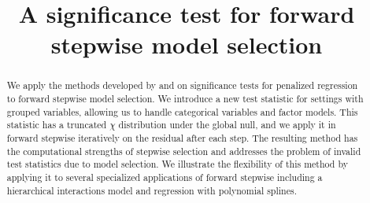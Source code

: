\documentclass{imsart}
\begin{document}
\begin{frontmatter}

\title{A significance test for forward stepwise model selection}




\address{Department of Statistics\\  Stanford University\\ Sequoia
Hall \\390 Serra Mall\\ Stanford, CA 94305, U.S.A.\\ }


\begin{abstract}
  We apply the methods developed by \cite{significance:lasso} and
  \cite{tests:adaptive} on significance tests for penalized
  regression to forward stepwise model selection. We introduce a new
  test statistic for settings with grouped variables, allowing us to
  handle categorical variables and factor models. This
  statistic has a truncated $\chi$ distribution under the global null,
  and we apply it in forward stepwise iteratively on the residual after
  each step. The resulting method
  has the computational strengths of stepwise selection and addresses
  the problem of invalid test statistics due to model selection.
  We illustrate the flexibility of this method by applying it to
  several specialized applications of forward stepwise including a
  hierarchical interactions model and regression with polynomial splines.
\end{abstract}

\begin{keyword}[class=AMS]
\end{keyword}

\begin{keyword}
\end{keyword}

\end{frontmatter}
\end{document}
